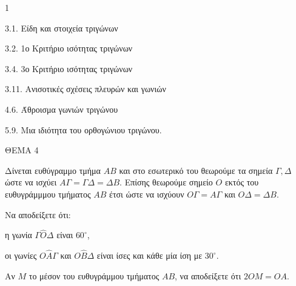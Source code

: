\begin{ylh}{1}
    \item 3.1. Είδη και στοιχεία τριγώνων
    \item 3.2. 1ο Κριτήριο ισότητας τριγώνων
    \item 3.4. 3ο Κριτήριο ισότητας τριγώνων
    \item 3.11. Ανισοτικές σχέσεις πλευρών και γωνιών
    \item 4.6. Άθροισμα γωνιών τριγώνου
    \item 5.9. Μια ιδιότητα του ορθογώνιου τριγώνου.
\end{ylh}

ΘΕΜΑ 4

Δίνεται ευθύγραμμο τμήμα $ΑΒ$ και στο εσωτερικό του θεωρούμε τα σημεία $\Gamma, \Delta$ ώστε να ισχύει $Α\Gamma = \Gamma\Delta = \Delta Β$. Επίσης θεωρούμε σημείο $Ο$ εκτός του ευθυγράμμμου τμήματος $ΑΒ$ έτσι ώστε να ισχύουν $Ο\Gamma = Α\Gamma$ και $Ο\Delta = \Delta Β$.

\begin{alist}
\item Να αποδείξετε ότι:
\begin{alist}
\item η γωνία $\Gamma\widehat{Ο}\Delta$ είναι $60^{\circ}$, 
\item οι γωνίες $Ο\widehat{Α}\Gamma$ και $Ο\widehat{Β}\Delta$ είναι ίσες και κάθε μία ίση με $30^{\circ}$. 
\end{alist}
\item Αν $M$ το μέσον του ευθυγράμμου τμήματος $ΑΒ$, να αποδείξετε ότι $2ΟΜ = ΟΑ$. 

\begin{center}
\end{center}
\end{alist}
